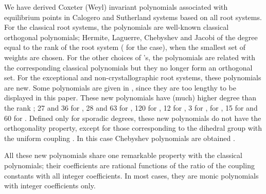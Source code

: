\documentclass[a4paper,12pt]{article}
\begin{document}
We have derived Coxeter (Weyl) invariant polynomials associated with
equilibrium points in Calogero and Sutherland systems based on all root
systems. For the classical root systems, the polynomials are well-known
classical orthogonal polynomials; Hermite, Laguerre, Chebyshev and Jacobi
of the degree equal to the rank \coordHE{} of the root system (\coordHE{} for the \coordHE{}
case), when the smallest set of weights \coordHE{} are chosen.
For the other choices of \coordHE{}'s, the polynomials are related with
the corresponding classical polynomials but they no longer form an orthogonal
set. For the exceptional and non-crystallographic root systems,
these polynomials are new. Some polynomials are given in \cite{poly},
since they are too lengthy to be displayed in this paper.
These new polynomials have (much) higher degree than the rank \coordHE{};
27 and 36 for \coordHE{}, 28 and 63 for \coordHE{}, 120 for \coordHE{}, 12 for \coordHE{},
3 for \coordHE{}, \coordHE{} for \coordHE{}, 15 for \coordHE{} and 60 for \coordHE{}.
Defined only for sporadic degrees, these new polynomials do not have
the orthogonality property, except for those corresponding to the dihedral
group \coordHE{} with the uniform coupling \coordHE{}.
In this case Chebyshev polynomials are obtained \cite{cs}.

All these new polynomials share one remarkable property with the classical
polynomials; their coefficients are rational functions of the ratio of
the coupling constants with all integer coefficients.
In most cases, they are monic polynomials with integer coefficients only.
\end{document}
